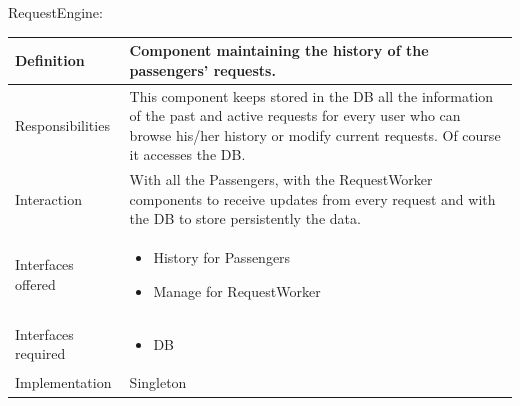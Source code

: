 \documentclass[a4paper,11pt]{report} %
\begin{document}
	\pagebreak
	\vspace*{-0.35cm}
	\centerline{RequestEngine:}
	\begin{center}
		\begin{tabular}{| l | p{9cm} |}\hline
			Definition & Component maintaining the history of the passengers' requests.\\\hline
			Responsibilities & This component keeps stored in the DB all the information of the past and active requests for every user who can browse his/her history or modify current requests. Of course it accesses the DB.\\\hline
			Interaction & With all the Passengers, with the RequestWorker components to receive updates from every request and with the DB to store persistently the data.\\\hline
			Interfaces offered & \begin{itemize}
				\item History for Passengers
				\item Manage for RequestWorker
			\end{itemize}\\\hline
			Interfaces required & \begin{itemize}
				\item DB
			\end{itemize}\\\hline
			Implementation & Singleton\\\hline
		\end{tabular}
	\end{center}		
	
\end{document}
